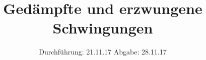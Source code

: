 

\subject{V354}
\title{Gedämpfte und erzwungene Schwingungen}
\date{
  Durchführung: 21.11.17
  \hspace{3em}
  Abgabe: 28.11.17
}



\maketitle
\thispagestyle{empty}
\tableofcontents
\newpage








\newpage
\printbibliography


